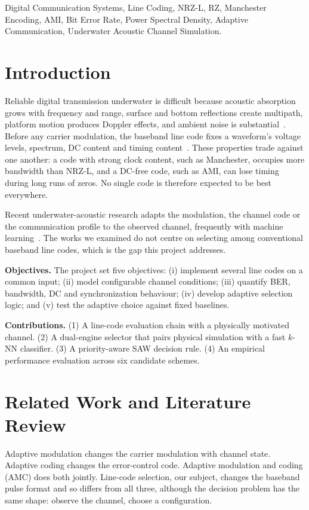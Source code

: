 \documentclass[conference]{IEEEtran}
\begin{document}
\begin{IEEEkeywords}
Digital Communication Systems, Line Coding, NRZ-L, RZ, Manchester Encoding, AMI, Bit Error Rate, Power Spectral Density, Adaptive Communication, Underwater Acoustic Channel Simulation.
\end{IEEEkeywords}

\section{Introduction}
Reliable digital transmission underwater is difficult because acoustic absorption grows with frequency and range, surface and bottom reflections create multipath, platform motion produces Doppler effects, and ambient noise is substantial~\cite{stojanovic2009underwater}. Before any carrier modulation, the baseband line code fixes a waveform's voltage levels, spectrum, DC content and timing content~\cite{proakis2008digital}. These properties trade against one another: a code with strong clock content, such as Manchester, occupies more bandwidth than NRZ-L, and a DC-free code, such as AMI, can lose timing during long runs of zeros. No single code is therefore expected to be best everywhere.

Recent underwater-acoustic research adapts the modulation, the channel code or the communication profile to the observed channel, frequently with machine learning~\cite{li2024reinforcement, chen2025optimal, jing2024adaptive, survey2026amc, adaptive2023profile, fan2021adaptive, kadali2025ai}. The works we examined do not centre on selecting among conventional baseband line codes, which is the gap this project addresses.

\textbf{Objectives.} The project set five objectives: (i) implement several line codes on a common input; (ii) model configurable channel conditions; (iii) quantify BER, bandwidth, DC and synchronization behaviour; (iv) develop adaptive selection logic; and (v) test the adaptive choice against fixed baselines.

\textbf{Contributions.} (1) A line-code evaluation chain with a physically motivated channel. (2) A dual-engine selector that pairs physical simulation with a fast $k$-NN classifier. (3) A priority-aware SAW decision rule. (4) An empirical performance evaluation across six candidate schemes.

\section{Related Work and Literature Review}
Adaptive modulation changes the carrier modulation with channel state. Adaptive coding changes the error-control code. Adaptive modulation and coding (AMC) does both jointly. Line-code selection, our subject, changes the baseband pulse format and so differs from all three, although the decision problem has the same shape: observe the channel, choose a configuration.
\end{document}
